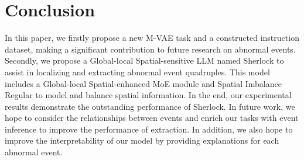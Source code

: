 \section{Conclusion}
In this paper, we firstly propose a new M-VAE task and a constructed instruction dataset, making a significant contribution to future research on abnormal events. Secondly, we propose a Global-local Spatial-sensitive LLM named Sherlock to assist in localizing and extracting abnormal event quadruples. This model includes a Global-local Spatial-enhanced MoE module and Spatial Imbalance Regular to model and balance spatial information. In the end, our experimental results demonstrate the outstanding performance of Sherlock. In future work, we hope to consider the relationships between events and enrich our tasks with event inference to improve the performance of extraction. In addition, we also hope to improve the interpretability of our model by providing explanations for each abnormal event.